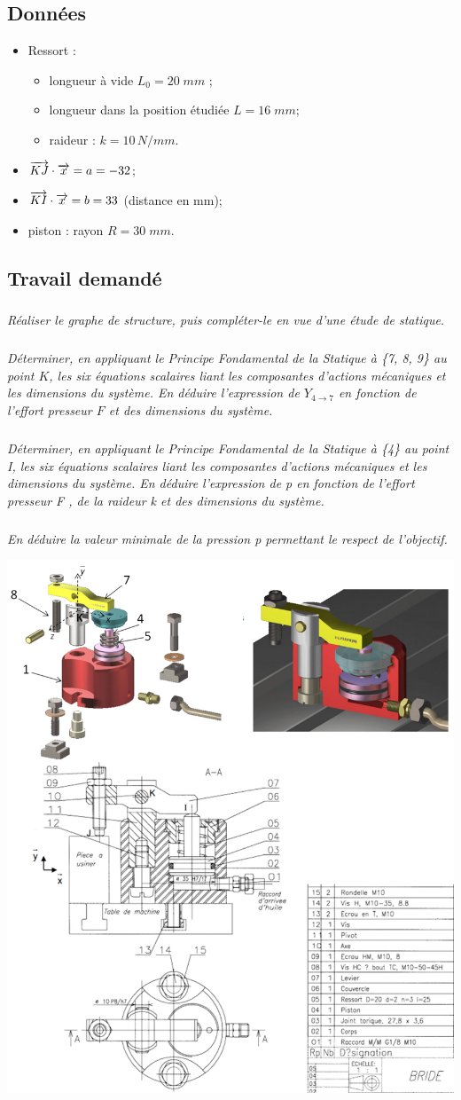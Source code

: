 \documentclass[10pt]{article}
\begin{document}
 \subsection*{Données}
\begin{itemize}
\item Ressort : 
\begin{itemize}
\item longueur à vide $L_0 = 20\; mm$ ; 
\item longueur dans la position étudiée $L = 16\; mm$; 
\item raideur : $k=10\, N/mm$.
\end{itemize}
\item $\overrightarrow{KJ}\cdot\overrightarrow{x}=a=-32$;
\item $\overrightarrow{KI}\cdot\overrightarrow{x}=b= 33$ (distance en mm);
\item piston : rayon $R=30\; mm$.\
\end{itemize}
   \subsection*{Travail demandé}
 
   \subparagraph{}
 \textit{Réaliser le graphe de structure, puis compléter-le en vue d’une étude de statique. }
   \subparagraph{}
 \textit{Déterminer, en appliquant le Principe Fondamental de la Statique à \{7, 8, 9\} au point $K$, les 
six équations scalaires liant les composantes d’actions mécaniques et les dimensions du 
système. En déduire l’expression de $Y_{4\rightarrow 7}$ en fonction de l'effort presseur $F$ et des dimensions du système.}
 
   \subparagraph{}
 \textit{Déterminer, en appliquant le Principe Fondamental de la Statique à \{4\} au point I, les six 
équations scalaires liant les composantes d’actions mécaniques et les dimensions du 
système. En déduire l’expression de p en fonction de l’effort presseur F , de la raideur 
k et 
des dimensions du système. 
}
   \subparagraph{}
 \textit{En déduire la valeur minimale de la pression 
p permettant le respect de l'objectif.}


\begin{center}
\includegraphics[width=.9\textwidth]{images/Fi01}
\end{center}
\end{document}
